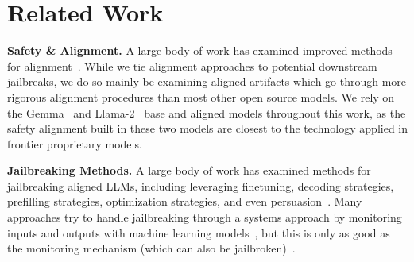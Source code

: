 \section{Related Work}
\label{sec:related}

\textbf{Safety \& Alignment.} A large body of work has examined improved methods for alignment~\citep{rafailov2023direct,ethayarajh2024kto,zou2023representation,bai2022constitutional,ouyang2022training,touvron2023llama-2,team2024gemma}. While we tie alignment approaches to potential downstream jailbreaks, we do so mainly be examining aligned artifacts which go through more rigorous alignment procedures than most other open source models. We rely on the Gemma~\citep{team2024gemma} and Llama-2~\citep{touvron2023llama-2} base and aligned models throughout this work, as the safety alignment built in these two models are closest to the technology applied in frontier proprietary models.

\textbf{Jailbreaking Methods.} A large body of work has examined methods for jailbreaking aligned LLMs, including leveraging finetuning, decoding strategies, prefilling strategies, optimization strategies, and even persuasion~\citep{andriushchenko2024jailbreaking,zou2023universal,qi2023fine,huang2023catastrophic,zeng2024johnny,zhan2023removing,yang2023shadow,gade2023badllama,prefilling-attack,qi2023visual}. Many approaches try to handle jailbreaking through a systems approach by monitoring inputs and outputs with machine learning models~\citep{inan2023llama}, but this is only as good as the monitoring mechanism (which can also be jailbroken)~\citep{break-llama-guard}.

